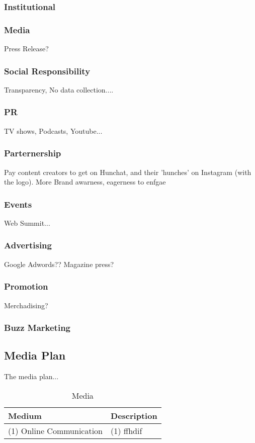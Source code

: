 \documentclass[12pt]{article}
\begin{document}
	
	\subsubsection{Institutional}
	
	\subsubsection{Media}
	Press Release?
	\subsubsection{Social Responsibility}
	Transparency, No data collection....
	\subsubsection{PR}
	TV shows, Podcasts, Youtube...
	\subsubsection{Parternership}
	Pay content creators to get on Hunchat, and their 'hunches' on Instagram (with the logo). More Brand awarness, eagerness to enfgae
	\subsubsection{Events}
	Web Summit...
	\subsubsection{Advertising}
	Google Adwords?? Magazine press?
	\subsubsection{Promotion}
	Merchadising?
	\subsubsection{Buzz Marketing}
	
\subsection{Media Plan}
The media plan...
\begin{table}[htbp]
\small
\caption{Media}
\label{table:media}
\centering
\begin{tabular}{ @{}P{0.2\textwidth}P{0.7\textwidth}@{} }
Medium	&	Description	\\ \hline
 (1) Online Communication	&	(1) ffhdif \\
\end{tabular}
\end{table}
\end{document}
